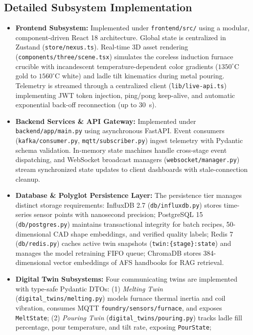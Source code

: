 \documentclass[11pt, a4paper]{article}
\begin{document}
\subsection{Detailed Subsystem Implementation}
\begin{itemize}[noitemsep, topsep=2pt]
    \item \textbf{Frontend Subsystem:} Implemented under \texttt{frontend/src/} using a modular, component-driven React 18 architecture. Global state is centralized in Zustand (\texttt{store/nexus.ts}). Real-time 3D asset rendering (\texttt{components/three/scene.tsx}) simulates the coreless induction furnace crucible with incandescent temperature-dependent color gradients ($1350^\circ\text{C}$ gold to $1560^\circ\text{C}$ white) and ladle tilt kinematics during metal pouring. Telemetry is streamed through a centralized client (\texttt{lib/live-api.ts}) implementing JWT token injection, ping/pong keep-alive, and automatic exponential back-off reconnection (up to 30~s).
    \item \textbf{Backend Services \& API Gateway:} Implemented under \texttt{backend/app/main.py} using asynchronous FastAPI. Event consumers (\texttt{kafka/consumer.py}, \texttt{mqtt/subscriber.py}) ingest telemetry with Pydantic schema validation. In-memory state machines handle cross-stage event dispatching, and WebSocket broadcast managers (\texttt{websocket/manager.py}) stream synchronized state updates to client dashboards with stale-connection cleanup.
    \item \textbf{Database \& Polyglot Persistence Layer:} The persistence tier manages distinct storage requirements: InfluxDB 2.7 (\texttt{db/influxdb.py}) stores time-series sensor points with nanosecond precision; PostgreSQL 15 (\texttt{db/postgres.py}) maintains transactional integrity for batch recipes, 50-dimensional CAD shape embeddings, and verified quality labels; Redis 7 (\texttt{db/redis.py}) caches active twin snapshots (\texttt{twin:\{stage\}:state}) and manages the model retraining FIFO queue; ChromaDB stores 384-dimensional vector embeddings of AFS handbooks for RAG retrieval.
    \item \textbf{Digital Twin Subsystems:} Four communicating twins are implemented with type-safe Pydantic DTOs:
    (1) \textit{Melting Twin} (\texttt{digital\_twins/melting.py}) models furnace thermal inertia and coil vibration, consumes MQTT \texttt{foundry/sensors/furnace}, and exposes \texttt{MeltState};
    (2) \textit{Pouring Twin} (\texttt{digital\_twins/pouring.py}) tracks ladle fill percentage, pour temperature, and tilt rate, exposing \texttt{PourState};

\end{itemize}
\end{document}
